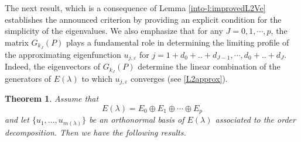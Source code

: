 \documentclass[11pt,reqno]{article}
\newtheorem{teo}{Theorem}[section]
\numberwithin{equation}{section}
\begin{document}
The next result, which is a consequence of Lemma \ref{into-l:improvedL2Ve} establishes the announced criterion by providing an explicit condition for the simplicity of the eigenvalues. We also emphasize that for any $J=0,1,\cdots,p$, the matrix $G_{k_J}(P)$ plays a fundamental role in determining the limiting profile of the approximating eigenfunction $u_{j,\varepsilon}$ for $j=1+d_0+..+d_{J-1},\cdots,d_0+..+d_J$. Indeed, the eigenvectors of $G_{k_J}(P)$ determine the linear combination of the generators of $E(\lambda)$ to which $u_{j,\varepsilon}$ converges (see \eqref{L2approx}).


\begin{teo}\label{sim}
		Assume that 
        \begin{equation}\label{i15}
          E(\lambda)=E_0\oplus E_1\oplus\cdots\oplus E_p  
        \end{equation}
        and let $\{u_1,\dots,u_{m(\lambda)}\}$ be an orthonormal basis of $E(\lambda)$ associated to the order decomposition. Then we have the following results.
        

\end{teo}
\end{document}
